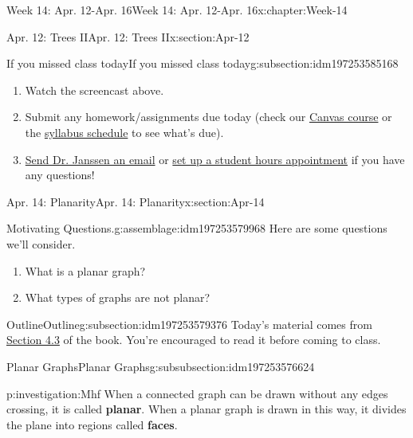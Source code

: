 \documentclass[oneside,10pt,]{book}
\newcommand{\terminology}[1]{\textbf{#1}}
\numberwithin{equation}{section}
\begin{document}
\begin{chapterptx}{Week 14: Apr. 12-Apr. 16}{}{Week 14: Apr. 12-Apr. 16}{}{}{x:chapter:Week-14}
\begin{sectionptx}{Apr. 12: Trees II}{}{Apr. 12: Trees II}{}{}{x:section:Apr-12}
\begin{subsectionptx}{If you missed class today}{}{If you missed class today}{}{}{g:subsection:idm197253585168}
\begin{enumerate}
\item{}Watch the screencast above.%
\item{}Submit any homework\slash{}assignments due today (check our \href{https://dordt.instructure.com/courses/3110050}{Canvas course} or the \href{https://prof.mkjanssen.org/ds/index.html\#schedule}{syllabus schedule} to see what's due).%
\item{}\href{mailto:mike.janssen@dordt.edu}{Send Dr. Janssen an email} or \href{https://calendly.com/mkjanssen/student-hours}{set up a student hours appointment} if you have any questions!%
\end{enumerate}
\end{subsectionptx}
\end{sectionptx}
%
%
\typeout{************************************************}
\typeout{************************************************}
%
\begin{sectionptx}{Apr. 14: Planarity}{}{Apr. 14: Planarity}{}{}{x:section:Apr-14}
\begin{introduction}{}%
\begin{assemblage}{Motivating Questions.}{g:assemblage:idm197253579968}%
Here are some questions we'll consider. %
\begin{enumerate}
\item{}What is a planar graph?%
\item{}What types of graphs are not planar?%
\end{enumerate}
%
\end{assemblage}
\end{introduction}%
%
%
\typeout{************************************************}
\typeout{************************************************}
%
\begin{subsectionptx}{Outline}{}{Outline}{}{}{g:subsection:idm197253579376}
Today's material comes from \href{http://discrete.openmathbooks.org/dmoi3/sec_planar.html}{Section 4.3} of the book. You're encouraged to read it before coming to class.%
%
%
\typeout{************************************************}
\typeout{************************************************}
%
\begin{subsubsectionptx}{Planar Graphs}{}{Planar Graphs}{}{}{g:subsubsection:idm197253576624}
\begin{investigation}{}{p:investigation:Mhf}%
%
%
%
%
When a connected graph can be drawn without any edges crossing, it is called \terminology{planar}. When a planar graph is drawn in this way, it divides the plane into regions called \terminology{faces}.%

\end{investigation}
\end{subsubsectionptx}
\end{subsectionptx}
\end{sectionptx}
\end{chapterptx}
\end{document}
